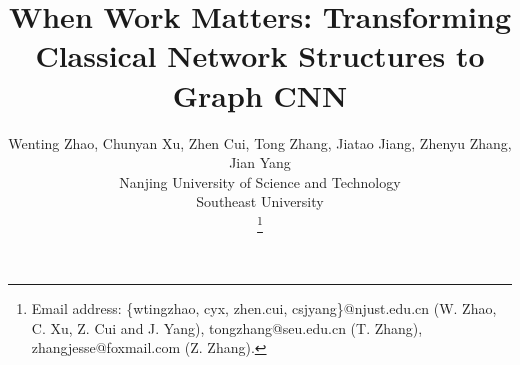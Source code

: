 \documentclass[journal]{IEEEtran}
\begin{document}
\title{When Work Matters: Transforming Classical Network Structures to Graph CNN}



\author{
	Wenting Zhao,
	Chunyan Xu,
	Zhen Cui,
	Tong Zhang,
	Jiatao Jiang,
	Zhenyu Zhang,
	Jian Yang
	\\
	      Nanjing University of Science and Technology
    \\
	 Southeast University




	
\thanks{Email address: \{wtingzhao, cyx, zhen.cui, csjyang\}@njust.edu.cn (W. Zhao, C. Xu, Z. Cui and J. Yang), tongzhang@seu.edu.cn (T. Zhang), zhangjesse@foxmail.com (Z. Zhang).}



}






















\maketitle
\end{document}
